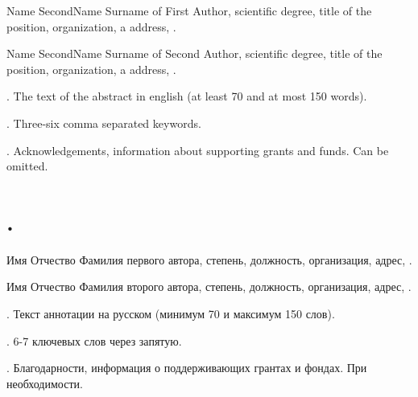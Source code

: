 \begin{abstr}
	Name SecondName Surname of First Author, scientific degree, title of the position, organization, a address, %
	. 
	\par 
	Name SecondName Surname of Second Author, scientific degree,  title of the position, organization, a address, %
	. 
	\par
	{\normalfont \abstractnameENG.} The text of the abstract in english (at least 70 and at most 150 words).
	\par
	{\normalfont \keywordsENG.} Three-six comma separated keywords.
	\par
	{\normalfont \acknowledgementsENG.} Acknowledgements, information about supporting grants and funds. Can be omitted. 
	\delnewpagebeforech %


	\chapter*{\normalsize\thechapter. \chapterRuTitle} %
	
	Имя Отчество Фамилия первого автора, степень, должность, организация, адрес, . %
	\par
	Имя Отчество Фамилия второго автора, степень, должность, организация, адрес, . %
	\par
	{\normalfont \abstractname.} Текст аннотации на русском (минимум 70 и максимум 150 слов).   
	\par
	{\normalfont \keywords.} 6-7 ключевых слов через запятую.
	\par
	{\normalfont \acknowledgements.} Благодарности, информация о поддерживающих грантах и фондах. При необходимости. 


\end{abstr}

